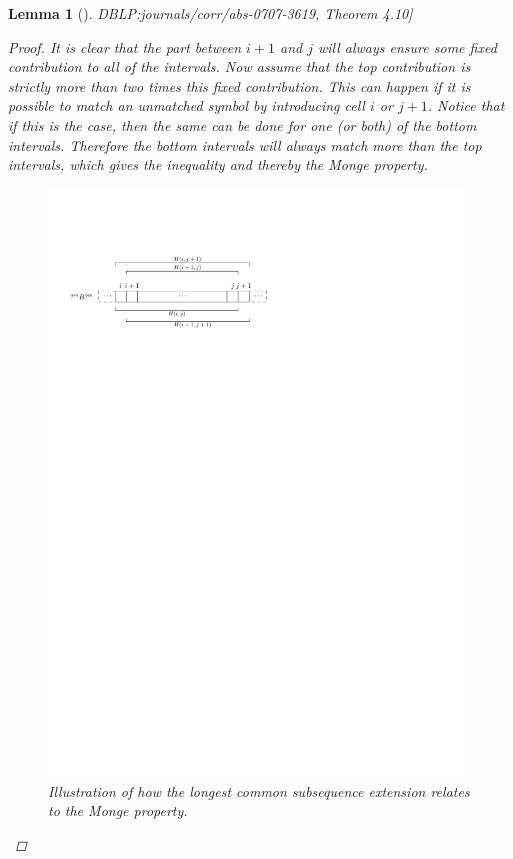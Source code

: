 \documentclass[twoside,11pt,openright]{report}
\newcommand{\refbook}[2]{\cite[#1]{DBLP:journals/corr/abs-0707-3619}, #2}
\newtheorem{lemma}{Lemma}
\begin{document}
\begin{lemma}[\refbook{p.-49}{Theorem 4.10}]
\begin{proof}
    It is clear that the part between $i + 1$ and $j$ will always ensure some fixed contribution to all of the intervals. Now assume that the top contribution is strictly more than two times this fixed contribution. This can happen if it is possible to match an unmatched symbol by introducing cell $i$ or $j + 1$. Notice that if this is the case, then the same can be done for one (or both) of the bottom intervals. Therefore the bottom intervals will always match more than the top intervals, which gives the inequality and thereby the Monge property.
    \begin{figure}[h!]
      \centering
      \includegraphics[width=11cm]{images/monge-condition-illustration}
      \caption{Illustration of how the longest common subsequence extension relates to the Monge property.}
      \label{fig:H-permutation-representation:monge}
    \end{figure}


\end{proof}
\end{lemma}
\end{document}
